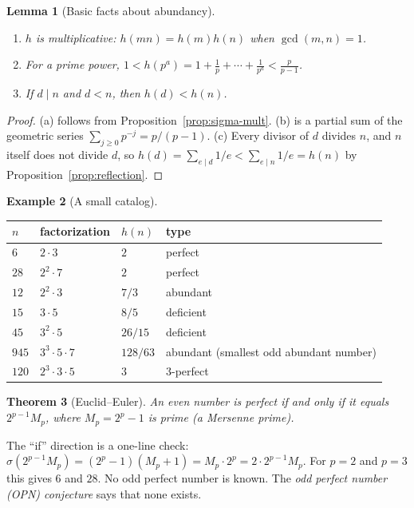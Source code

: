 \documentclass[11pt]{article}
\newtheorem{theorem}{Theorem}[section]
\newtheorem{lemma}[theorem]{Lemma}
\theoremstyle{definition}
\newtheorem{example}[theorem]{Example}
\theoremstyle{remark}
\begin{document}
\begin{lemma}[Basic facts about abundancy]\label{lem:abundancy}
\begin{enumerate}[label=(\alph*)]
\item $h$ is multiplicative: $h(mn)=h(m)h(n)$ when $\gcd(m,n)=1$.
\item For a prime power, $1<h(p^a)=1+\frac1p+\cdots+\frac1{p^a}<\frac{p}{p-1}$.
\item If $d\mid n$ and $d<n$, then $h(d)<h(n)$.
\end{enumerate}
\end{lemma}

\begin{proof}
(a) follows from Proposition~\ref{prop:sigma-mult}.  (b) is a partial sum of
the geometric series $\sum_{j\ge0}p^{-j}=p/(p-1)$.  (c) Every divisor of $d$
divides $n$, and $n$ itself does not divide $d$, so
$h(d)=\sum_{e\mid d}1/e<\sum_{e\mid n}1/e=h(n)$ by
Proposition~\ref{prop:reflection}.
\end{proof}

\begin{example}[A small catalog]\label{ex:catalog}
\begin{center}
\begin{tabular}{@{}llll@{}}
\toprule
$n$ & factorization & $h(n)$ & type\\
\midrule
$6$ & $2\cdot3$ & $2$ & perfect\\
$28$ & $2^2\cdot7$ & $2$ & perfect\\
$12$ & $2^2\cdot3$ & $7/3$ & abundant\\
$15$ & $3\cdot5$ & $8/5$ & deficient\\
$45$ & $3^2\cdot5$ & $26/15$ & deficient\\
$945$ & $3^3\cdot5\cdot7$ & $128/63$ & abundant (smallest odd abundant number)\\
$120$ & $2^3\cdot3\cdot5$ & $3$ & $3$-perfect\\
\bottomrule
\end{tabular}
\end{center}
\end{example}

\begin{theorem}[Euclid--Euler]\label{thm:euclid-euler}
An even number is perfect if and only if it equals $2^{p-1}M_p$, where
$M_p=2^p-1$ is prime (a \emph{Mersenne prime}).
\end{theorem}

The ``if'' direction is a one-line check:
$\sigma(2^{p-1}M_p)=(2^p-1)(M_p+1)=M_p\cdot2^p=2\cdot2^{p-1}M_p$.  For
$p=2$ and $p=3$ this gives $6$ and $28$.  No odd perfect number is known.
The \emph{odd perfect number (OPN) conjecture} says that none exists.
\end{document}
